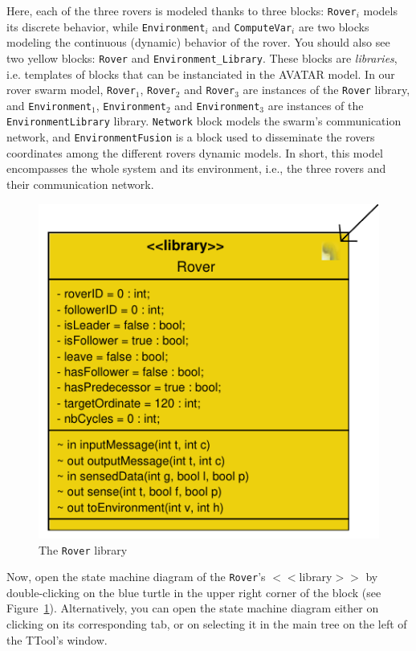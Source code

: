 \documentclass{article}
\begin{document}
Here, each of the three rovers is modeled thanks to three blocks: \texttt{Rover$_i$} models its discrete behavior, while \texttt{Environment$_i$} and \texttt{ComputeVar$_i$} are two blocks modeling the continuous (dynamic) behavior of the rover. You should also see two yellow blocks: \texttt{Rover} and \texttt{Environment\_Library}. These blocks are \emph{libraries}, i.e. templates of blocks that can be instanciated in the AVATAR model. In our rover swarm model, \texttt{Rover$_1$}, \texttt{Rover$_2$} and \texttt{Rover$_3$} are instances of the \texttt{Rover} library, and \texttt{Environment$_1$}, \texttt{Environment$_2$} and \texttt{Environment$_3$} are instances of the \texttt{EnvironmentLibrary} library. \texttt{Network} block models the swarm's communication network, and \texttt{EnvironmentFusion} is a block used to disseminate the rovers coordinates among the different rovers dynamic models. In short, this model encompasses the whole system and its environment, i.e., the three rovers and their communication network.

\begin{figure}
	\centering
	\includegraphics[scale=.6]{figures/roverlibrary.pdf}
	\caption{The \texttt{Rover} library}
	\label{fig:opensmd}
\end{figure}

Now, open the state machine diagram of the \texttt{Rover}'s $<<$library$>>$  by double-clicking on the blue turtle in the upper right corner of the block (see Figure~\ref{fig:opensmd}). Alternatively, you can open the state machine diagram either on clicking on its corresponding tab, or on selecting it in the main tree on the left of the TTool's window. 
\end{document}

